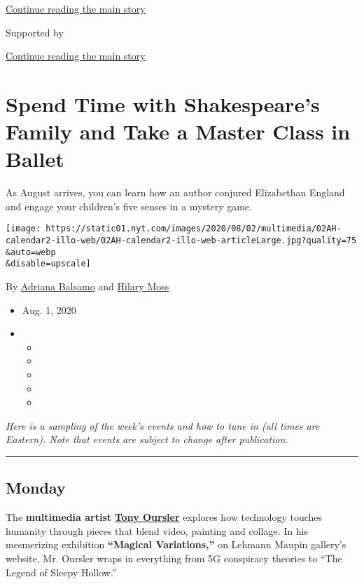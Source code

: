 \protect\hyperlink{after-top}{Continue reading the main story}

Supported by

\protect\hyperlink{after-sponsor}{Continue reading the main story}

\hypertarget{spend-time-with-shakespeares-family-and-take-a-master-class-in-ballet}{%
\section{Spend Time with Shakespeare's Family and Take a Master Class in
Ballet}\label{spend-time-with-shakespeares-family-and-take-a-master-class-in-ballet}}

As August arrives, you can learn how an author conjured Elizabethan
England and engage your children's five senses in a mystery game.

\texttt{[image: https://static01.nyt.com/images/2020/08/02/multimedia/02AH-calendar2-illo-web/02AH-calendar2-illo-web-articleLarge.jpg?quality=75\\\&auto=webp\\\&disable=upscale]}

By \href{https://www.nytimes.com/by/adriana-balsamo}{Adriana Balsamo}
and \href{https://www.nytimes.com/by/hilary-moss}{Hilary Moss}

\begin{itemize}
\item
  Aug. 1, 2020
\item
  \begin{itemize}
  \item
  \item
  \item
  \item
  \item
  \end{itemize}
\end{itemize}

\emph{Here is a sampling of the week's events and how to tune in (all
times are Eastern). Note that events are subject to change after
publication.}

\begin{center}\rule{0.5\linewidth}{\linethickness}\end{center}

\hypertarget{monday}{%
\subsection{Monday}\label{monday}}

The \textbf{multimedia artist}
\textbf{\href{https://www.nytimes.com/2015/06/09/t-magazine/tony-oursler-home-studio-tour.html}{Tony
Oursler}} explores how technology touches humanity through pieces that
blend video, painting and collage. In his mesmerizing exhibition
\textbf{``Magical Variations,''} on Lehmann Maupin gallery's website,
Mr. Oursler wraps in everything from 5G conspiracy theories to ``The
Legend of Sleepy Hollow.''

